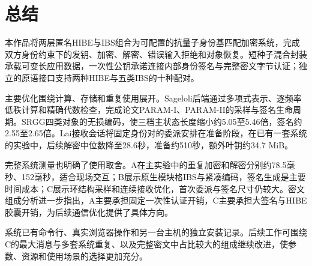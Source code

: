 \chapter{总结}

本作品将两层匿名HIBE与IBS组合为可配置的抗量子身份基匹配加密系统，完成双方身份约束下的发钥、加密、解密、错误输入拒绝和对象恢复。短种子混合封装承载可变长应用数据，一次性公钥承诺连接内部身份签名与完整密文字节认证；独立的原语接口支持两种HIBE与五类IBS的十种配对。

主要优化围绕计算、存储和重复使用展开。Sageloli后端通过多项式表示、逐频率低秩计算和精确代数检查，完成论文PARAM-I、PARAM-II的采样与签名生命周期。SRGG四类对象的无损编码，使三档主状态长度缩小约5.05至5.46倍，签名约2.55至2.65倍。Lai接收会话将固定身份对的委派安排在准备阶段，在已有一套系统的实验中，后续解密中位数降至28.6秒，准备约510秒，额外叶钥约34.7 MiB。

完整系统测量也明确了使用取舍。A在主实验中的重复加密和解密分别约78.5毫秒、152毫秒，适合现场交互；B展示原生模块格IBS与紧凑编码，签名生成是主要时间成本；C展示环结构采样和连续接收优化，首次委派与签名尺寸仍较大。密文组成分析进一步指出，A主要承担固定一次性认证开销，C主要承担大签名与HIBE胶囊开销，为后续通信优化提供了具体方向。

系统已有命令行、真实浏览器操作和另一台主机的独立安装记录。后续工作可围绕C的最大消息与多套系统重复、以及完整密文中占比较大的组成继续改进，使参数、资源和使用场景的选择更加充分。
